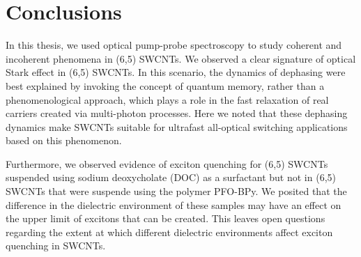 \chapter{Conclusions}

In this thesis, we used optical pump-probe spectroscopy to study coherent and incoherent phenomena in (6,5) SWCNTs. We observed a clear signature of optical Stark effect in (6,5) SWCNTs. In this scenario, the dynamics of dephasing were best explained by invoking the concept of quantum memory, rather than a phenomenological approach, which plays a role in the fast relaxation of real carriers created via multi-photon processes. Here we noted that these dephasing dynamics make SWCNTs suitable for ultrafast all-optical switching applications based on this phenomenon.

Furthermore, we observed evidence of exciton quenching for (6,5) SWCNTs suspended using sodium deoxycholate (DOC) as a surfactant but not in (6,5) SWCNTs that were suspende using the polymer PFO-BPy. We posited that the difference in the dielectric environment of these samples may have an effect on the upper limit of excitons that can be created. This leaves open questions regarding the extent at which different dielectric environments affect exciton quenching in SWCNTs. 
